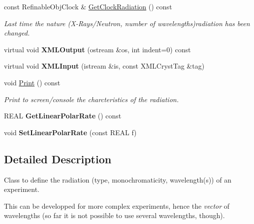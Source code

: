 \begin{DoxyCompactItemize}
const Refinable\+Obj\+Clock \& \mbox{\hyperlink{class_obj_cryst_1_1_radiation_aaaaad05a30a89eb27253351a4e33107b}{Get\+Clock\+Radiation}} () const
\begin{DoxyCompactList}\small\item\em Last time the nature (X-\/\+Rays/\+Neutron, number of wavelengths)radiation has been changed. \end{DoxyCompactList}\item 
\mbox{\label{class_obj_cryst_1_1_radiation_a17aa348756f1810bc35c7e9d43bbd919}} 
virtual void {\bfseries X\+M\+L\+Output} (ostream \&os, int indent=0) const
\item 
\mbox{\label{class_obj_cryst_1_1_radiation_a3e2993bf1c1fcbe1920d8add9ef651e5}} 
virtual void {\bfseries X\+M\+L\+Input} (istream \&is, const X\+M\+L\+Cryst\+Tag \&tag)
\item 
\mbox{\label{class_obj_cryst_1_1_radiation_a160b0e118c3a5c08ed85078075d40127}} 
void \mbox{\hyperlink{class_obj_cryst_1_1_radiation_a160b0e118c3a5c08ed85078075d40127}{Print}} () const
\begin{DoxyCompactList}\small\item\em Print to screen/console the charcteristics of the radiation. \end{DoxyCompactList}\item 
\mbox{\label{class_obj_cryst_1_1_radiation_aacf049c2245d96554275055ee1fd9166}} 
R\+E\+AL {\bfseries Get\+Linear\+Polar\+Rate} () const
\item 
\mbox{\label{class_obj_cryst_1_1_radiation_a9602288c888944773e93fa67f8542d95}} 
void {\bfseries Set\+Linear\+Polar\+Rate} (const R\+E\+AL f)
\end{DoxyCompactItemize}


\subsection{Detailed Description}
Class to define the radiation (type, monochromaticity, wavelength(s)) of an experiment. 

This can be developped for more complex experiments, hence the {\itshape vector} of wavelengths (so far it is not possible to use several wavelengths, though).

